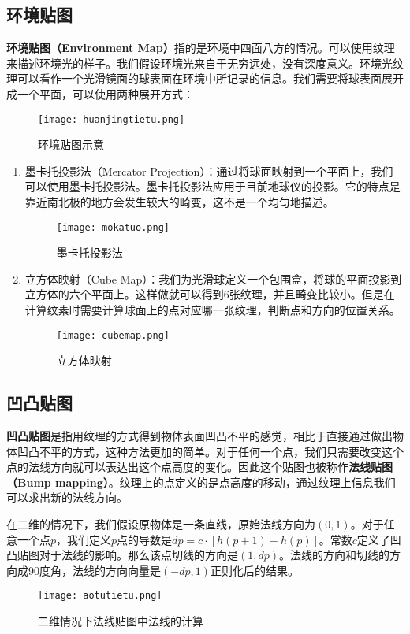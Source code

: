\documentclass[openany]{progbookcn}
\begin{document}
\subsection{环境贴图}
\textbf{环境贴图（Environment Map）}指的是环境中四面八方的情况。可以使用纹理来描述环境光的样子。我们假设环境光来自于无穷远处，没有深度意义。环境光纹理可以看作一个光滑镜面的球表面在环境中所记录的信息。我们需要将球表面展开成一个平面，可以使用两种展开方式：
\begin{figure}[H]
	\centering
	\texttt{[image: huanjingtietu.png]}
	\caption{环境贴图示意}
	\label{fig:huanjingtietu}
\end{figure}
\begin{enumerate}
	\item 墨卡托投影法（Mercator Projection）：通过将球面映射到一个平面上，我们可以使用墨卡托投影法。墨卡托投影法应用于目前地球仪的投影。它的特点是靠近南北极的地方会发生较大的畸变，这不是一个均匀地描述。
	\begin{figure}[H]
		\centering
		\texttt{[image: mokatuo.png]}
		\caption{墨卡托投影法}
		\label{fig:mokatuo}
	\end{figure}
	\item 立方体映射（Cube Map）：我们为光滑球定义一个包围盒，将球的平面投影到立方体的六个平面上。这样做就可以得到6张纹理，并且畸变比较小。但是在计算纹素时需要计算球面上的点对应哪一张纹理，判断点和方向的位置关系。
	\begin{figure}[H]
	\centering
	\texttt{[image: cubemap.png]}
	\caption{立方体映射}
	\label{fig:cubemap}
	\end{figure}
\end{enumerate}

\subsection{凹凸贴图}
\textbf{凹凸贴图}是指用纹理的方式得到物体表面凹凸不平的感觉，相比于直接通过做出物体凹凸不平的方式，这种方法更加的简单。对于任何一个点，我们只需要改变这个点的法线方向就可以表达出这个点高度的变化。因此这个贴图也被称作\textbf{法线贴图（Bump mapping）}。纹理上的点定义的是点高度的移动，通过纹理上信息我们可以求出新的法线方向。

在二维的情况下，我们假设原物体是一条直线，原始法线方向为$(0,1)$。对于任意一个点$p$，我们定义$p$点的导数是$dp=c\cdot [h(p+1)-h(p)]$。常数$c$定义了凹凸贴图对于法线的影响。那么该点切线的方向是$(1, dp)$。法线的方向和切线的方向成90度角，法线的方向向量是$(-dp, 1)$正则化后的结果。
\begin{figure}[H]
	\centering
	\texttt{[image: aotutietu.png]}
	\caption{二维情况下法线贴图中法线的计算}
	\label{fig:aotu}
\end{figure}
\end{document}

